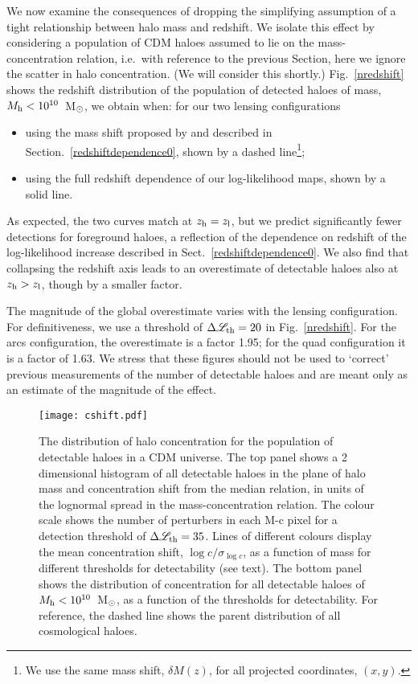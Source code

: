 \documentclass[a4paper, fleqn, usenatbib, useAMS]{mnras}
\def\DL{\Delta\mathscr{L}}
\begin{document}
We now examine the consequences of dropping the simplifying assumption
of a tight relationship between halo mass and redshift. 
We isolate this effect by considering a population of CDM haloes
assumed to lie on the \citet{Ludlow2016} mass-concentration relation,
i.e.\ with reference to the previous Section, here we ignore the
scatter in halo concentration. (We will consider this shortly.) Fig.~\ref{nredshift} shows 
the redshift distribution of the population of detected haloes of
mass, $M_{\rm h}<10^{10}$~M$_{\rm \odot}$, we obtain when:
for our two lensing configurations
\begin{itemize}
\item{using the mass shift proposed by \citet{Despali2018} and described in Section.~\ref{redshiftdependence0}, 
shown by a dashed line\footnote{We use the same 
mass shift, $\delta M(z)$, for all projected coordinates, $(x,y)$.};}
\item{using the full redshift dependence of our log-likelihood maps, shown by a solid line.}
\end{itemize}
As expected, the two curves match at $z_{\rm h}=z_{\rm l}$, but we
predict significantly fewer detections 
for foreground haloes, a reflection of the dependence on redshift of the log-likelihood increase described in 
Sect.~\ref{redshiftdependence0}. We also find that collapsing the
redshift axis leads to an overestimate of 
detectable haloes also at $z_{\rm h}>z_{\rm l}$, though by a smaller factor. 

The magnitude of the global overestimate varies with the lensing
configuration.  For definitiveness, we use a threshold of 
$\DL_{\rm th}=20$ in Fig.~\ref{nredshift}. For the arcs configuration, 
the overestimate is  a factor 1.95; for the quad configuration it is
a factor of 1.63. 
We stress that these figures should not be used to `correct' previous measurements of the number of detectable haloes 
and are meant only as an estimate of the magnitude of the effect. 


\begin{figure}
\centering
\texttt{[image: cshift.pdf]}
\caption{The distribution of halo concentration for the population of detectable haloes in a CDM universe.
The top panel shows a 2 dimensional histogram of all detectable haloes in the plane of halo mass
and concentration shift from the median relation, in units of the lognormal spread in the 
mass-concentration relation. The colour scale shows the number of 
perturbers in each M-c pixel for a detection threshold of 
$\DL_{\rm th}=35$. Lines of different colours display the mean concentration shift, $\log c/\sigma_{\log c}$, as a function
of mass for different thresholds for detectability (see text). 
The bottom panel shows the distribution of concentration for all
detectable haloes of $M_{\rm h}<10^{10}$~M$_{\rm \odot}$, as a function of the thresholds for detectability. For reference, the dashed line shows the 
parent distribution of all cosmological haloes. }
\label{cshift}
\end{figure}
\end{document}
